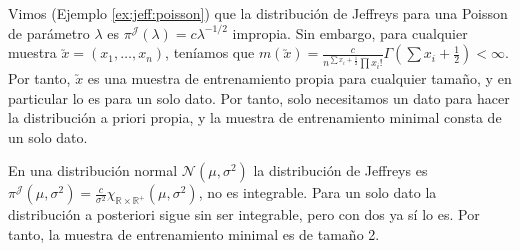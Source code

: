 	\begin{ex}
		Vimos (Ejemplo \ref{ex:jeff:poisson}) que la distribución de Jeffreys para una Poisson de parámetro $\lambda$ es $\pi^{\mathcal{J}}(\lambda)=c\lambda^{-1/2}$ impropia. Sin embargo, para cualquier muestra $\utilde{x}=(x_1,\ldots,x_n)$, teníamos que $m(\utilde{x}) = \frac{c}{n ^{\sum{x_i} + \frac{1}{2}}\prod{x_i!}}\Gamma(\sum{x_i} + \frac{1}{2}) < \infty$. Por tanto, $\utilde{x}$ es una muestra de entrenamiento propia para cualquier tamaño, y en particular lo es para un solo dato. Por tanto, solo necesitamos un dato para hacer la distribución a priori propia, y la muestra de entrenamiento minimal consta de un solo dato.
	\end{ex}

	\begin{ex}
		En una distribución normal $\mathcal{N}(\mu,\sigma^2)$ la distribución de Jeffreys es $\pi^{\mathcal{J}}(\mu,\sigma^2) = \frac{c}{\sigma^2}\chi_{\mathbb{R}\times{\mathbb{R}^{+}}}(\mu,\sigma^2)$, no es integrable. Para un solo dato la distribución a posteriori sigue sin ser integrable, pero con dos ya sí lo es. Por tanto, la muestra de entrenamiento minimal es de tamaño 2.
	\end{ex}

